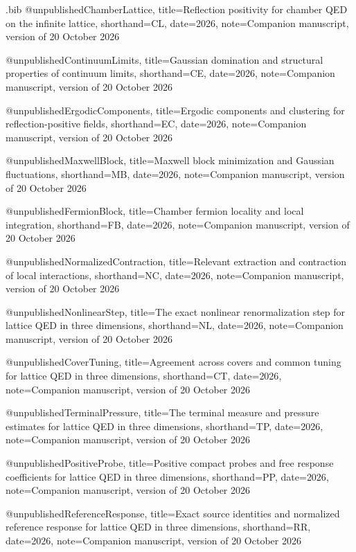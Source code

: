 \begin{filecontents*}[overwrite]{\jobname.bib}
@unpublished{ChamberLattice,
 title={Reflection positivity for chamber {QED} on the infinite lattice},
 shorthand={CL}, date={2026}, note={Companion manuscript, version of 20 October 2026}}

@unpublished{ContinuumLimits,
 title={Gaussian domination and structural properties of continuum limits},
 shorthand={CE}, date={2026}, note={Companion manuscript, version of 20 October 2026}}

@unpublished{ErgodicComponents,
 title={Ergodic components and clustering for reflection-positive fields},
 shorthand={EC}, date={2026}, note={Companion manuscript, version of 20 October 2026}}

@unpublished{MaxwellBlock,
 title={Maxwell block minimization and Gaussian fluctuations},
 shorthand={MB}, date={2026}, note={Companion manuscript, version of 20 October 2026}}

@unpublished{FermionBlock,
 title={Chamber fermion locality and local integration},
 shorthand={FB}, date={2026}, note={Companion manuscript, version of 20 October 2026}}

@unpublished{NormalizedContraction,
 title={Relevant extraction and contraction of local interactions},
 shorthand={NC}, date={2026}, note={Companion manuscript, version of 20 October 2026}}

@unpublished{NonlinearStep,
 title={The exact nonlinear renormalization step for lattice {QED} in three dimensions},
 shorthand={NL}, date={2026}, note={Companion manuscript, version of 20 October 2026}}

@unpublished{CoverTuning,
 title={Agreement across covers and common tuning for lattice {QED} in three dimensions},
 shorthand={CT}, date={2026}, note={Companion manuscript, version of 20 October 2026}}

@unpublished{TerminalPressure,
 title={The terminal measure and pressure estimates for lattice {QED} in three dimensions},
 shorthand={TP}, date={2026}, note={Companion manuscript, version of 20 October 2026}}

@unpublished{PositiveProbe,
 title={Positive compact probes and free response coefficients for lattice {QED} in three dimensions},
 shorthand={PP}, date={2026}, note={Companion manuscript, version of 20 October 2026}}

@unpublished{ReferenceResponse,
 title={Exact source identities and normalized reference response for lattice {QED} in three dimensions},
 shorthand={RR}, date={2026}, note={Companion manuscript, version of 20 October 2026}}


\end{filecontents*}
